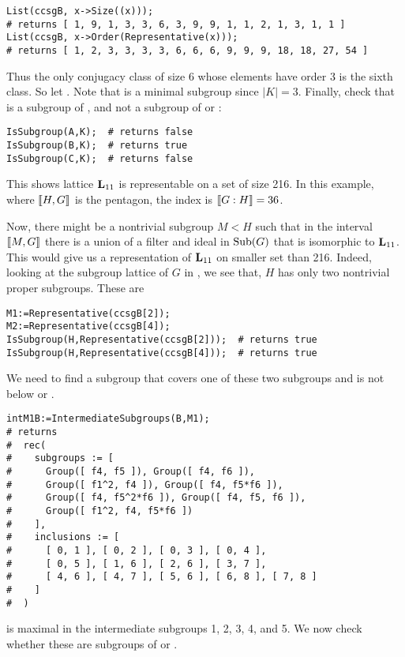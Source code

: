{\small 
\begin{verbatim}
List(ccsgB, x->Size((x)));
# returns [ 1, 9, 1, 3, 3, 6, 3, 9, 9, 1, 1, 2, 1, 3, 1, 1 ]
List(ccsgB, x->Order(Representative(x)));
# returns [ 1, 2, 3, 3, 3, 3, 6, 6, 6, 9, 9, 9, 18, 18, 27, 54 ]
\end{verbatim}
}
Thus the only conjugacy class of size 6 whose elements 
have order 3 is the sixth class.  So let
.
Note that  is a minimal subgroup since $|K|=3$.  Finally,
check that  is a subgroup of , and not a subgroup of
 or :
{\small 
\begin{verbatim}
IsSubgroup(A,K);  # returns false
IsSubgroup(B,K);  # returns true
IsSubgroup(C,K);  # returns false
\end{verbatim}
}
This shows lattice $\mathbf{L}_{11}$ is representable on a set of size 216.
In this example, where $\llbracket H,G \rrbracket$ is the pentagon, the index is $\llbracket G:H \rrbracket=36$.  

Now, there might be a nontrivial subgroup $M < H$ such that in the interval
$\llbracket M, G \rrbracket$ there is a union of a filter and ideal in $\operatorname{Sub}(G)$ that is isomorphic to
$\mathbf{L}_{11}$. This would give us a representation of $\mathbf{L}_{11}$ on smaller set than 216.
Indeed, looking at the subgroup lattice of $G$ in \xgap, we see that, 
$H$ has only two nontrivial proper subgroups.  These are

{\small 
\begin{verbatim}
M1:=Representative(ccsgB[2]);
M2:=Representative(ccsgB[4]);
IsSubgroup(H,Representative(ccsgB[2]));  # returns true
IsSubgroup(H,Representative(ccsgB[4]));  # returns true
\end{verbatim}
}
We need to find a subgroup that covers one of these two subgroups
and is not below  or .
{\small 
\begin{verbatim}
intM1B:=IntermediateSubgroups(B,M1);
# returns 
#  rec( 
#    subgroups := [ 
#      Group([ f4, f5 ]), Group([ f4, f6 ]), 
#      Group([ f1^2, f4 ]), Group([ f4, f5*f6 ]), 
#      Group([ f4, f5^2*f6 ]), Group([ f4, f5, f6 ]), 
#      Group([ f1^2, f4, f5*f6 ]) 
#    ], 
#    inclusions := [ 
#      [ 0, 1 ], [ 0, 2 ], [ 0, 3 ], [ 0, 4 ], 
#      [ 0, 5 ], [ 1, 6 ], [ 2, 6 ], [ 3, 7 ], 
#      [ 4, 6 ], [ 4, 7 ], [ 5, 6 ], [ 6, 8 ], [ 7, 8 ] 
#    ] 
#  )
\end{verbatim}
}
 is maximal in the intermediate subgroups 1, 2, 3, 4, and 5.
We now check whether these are subgroups of  or .

